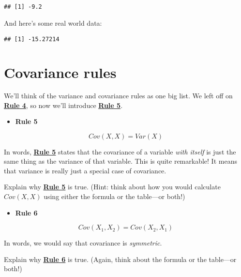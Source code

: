 \documentclass[
]{book}
\newenvironment{Shaded}{\begin{snugshade}}{\end{snugshade}}
\newcommand{\FunctionTok}[1]{\textcolor[rgb]{0.00,0.00,0.00}{#1}}
\newcommand{\NormalTok}[1]{#1}
\newcommand{\SpecialCharTok}[1]{\textcolor[rgb]{0.00,0.00,0.00}{#1}}
\providecommand{\tightlist}{%
  \setlength{\itemsep}{0pt}\setlength{\parskip}{0pt}}
\begin{document}
\begin{verbatim}
## [1] -9.2
\end{verbatim}

And here's some real world data:

\begin{Shaded}
\end{Shaded}

\begin{verbatim}
## [1] -15.27214
\end{verbatim}

\hypertarget{covariance-rules}{%
\section{Covariance rules}\label{covariance-rules}}

We'll think of the variance and covariance rules as one big list. We left off on \href{./variance.html\#Rule4}{\textbf{Rule 4}}, so now we'll introduce \protect\hyperlink{Rule5}{\textbf{Rule 5}}.

\begin{itemize}
\tightlist
\item
  \textbf{Rule 5}
\end{itemize}

\[
Cov(X, X) = Var(X)
\]

In words, \protect\hyperlink{Rule5}{\textbf{Rule 5}} states that the covariance of a variable \emph{with itself} is just the same thing as the variance of that variable. This is quite remarkable! It means that variance is really just a special case of covariance.

Explain why \protect\hyperlink{Rule5}{\textbf{Rule 5}} is true. (Hint: think about how you would calculate \(Cov(X, X)\) using either the formula or the table---or both!)

\begin{itemize}
\tightlist
\item
  \textbf{Rule 6}
\end{itemize}

\[
Cov\left(X_{1}, X_{2}\right) = Cov\left(X_{2}, X_{1}\right)
\]

In words, we would say that covariance is \emph{symmetric}.

Explain why \protect\hyperlink{Rule6}{\textbf{Rule 6}} is true. (Again, think about the formula or the table---or both!)
\end{document}
